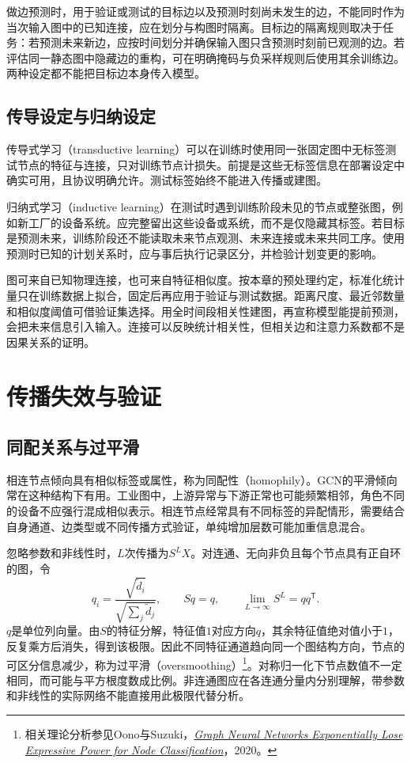 做边预测时，用于验证或测试的目标边以及预测时刻尚未发生的边，不能同时作为当次输入图中的已知连接，应在划分与构图时隔离。目标边的隔离规则取决于任务：若预测未来新边，应按时间划分并确保输入图只含预测时刻前已观测的边。若评估同一静态图中隐藏边的重构，可在明确掩码与负采样规则后使用其余训练边。两种设定都不能把目标边本身传入模型。

\subsection{传导设定与归纳设定}
传导式学习（transductive learning）可以在训练时使用同一张固定图中无标签测试节点的特征与连接，只对训练节点计损失。前提是这些无标签信息在部署设定中确实可用，且协议明确允许。测试标签始终不能进入传播或建图。

归纳式学习（inductive learning）在测试时遇到训练阶段未见的节点或整张图，例如新工厂的设备系统。应完整留出这些设备或系统，而不是仅隐藏其标签。若目标是预测未来，训练阶段还不能读取未来节点观测、未来连接或未来共同工序。使用预测时已知的计划关系时，应与事后执行记录区分，并检验计划变更的影响。

图可来自已知物理连接，也可来自特征相似度。按本章的预处理约定，标准化统计量只在训练数据上拟合，固定后再应用于验证与测试数据。距离尺度、最近邻数量和相似度阈值可借验证集选择。用全时间段相关性建图，再宣称模型能提前预测，会把未来信息引入输入。连接可以反映统计相关性，但相关边和注意力系数都不是因果关系的证明。

\section{传播失效与验证}
\subsection{同配关系与过平滑}
相连节点倾向具有相似标签或属性，称为同配性（homophily）。GCN的平滑倾向常在这种结构下有用。工业图中，上游异常与下游正常也可能频繁相邻，角色不同的设备不应强行混成相似表示。相连节点经常具有不同标签的异配情形，需要结合自身通道、边类型或不同传播方式验证，单纯增加层数可能加重信息混合。

忽略参数和非线性时，$L$次传播为$S^LX$。对连通、无向非负且每个节点具有正自环的图，令
\begin{equation}
 q_i=\frac{\sqrt{\widetilde d_i}}{\sqrt{\sum_j\widetilde d_j}},\qquad
 Sq=q,\qquad \lim_{L\to\infty}S^L=qq^{\mathsf T}.
 \label{eq:graph-oversmoothing-limit}
\end{equation}
$q$是单位列向量。由$S$的特征分解，特征值$1$对应方向$q$，其余特征值绝对值小于$1$，反复乘方后消失，得到该极限。因此不同特征通道趋向同一个图结构方向，节点的可区分信息减少，称为过平滑（oversmoothing）\footnote{相关理论分析参见Oono与Suzuki，\href{https://arxiv.org/abs/1905.10947}{\textit{Graph Neural Networks Exponentially Lose Expressive Power for Node Classification}}，2020。}。对称归一化下节点数值不一定相同，而可能与平方根度数成比例。非连通图应在各连通分量内分别理解，带参数和非线性的实际网络不能直接用此极限代替分析。


